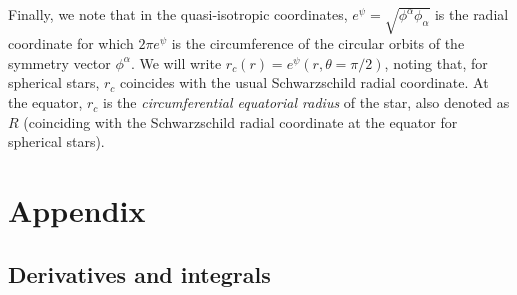 \documentclass[12pt]{article}
\begin{document}
{Finally, we note that in the quasi-isotropic coordinates, 
$e^\psi = \sqrt{\phi^\alpha\phi_\alpha}$ is the radial coordinate for which 
$2\pi e^\psi$ is the circumference of the circular orbits of the symmetry vector 
$\phi^\alpha$. We will write $r_c(r) = e^\psi(r,\theta=\pi/2)$, noting that, 
for spherical stars, $r_c$ coincides with the usual Schwarzschild radial coordinate. 
At the equator, $r_c$ is the {\it circumferential equatorial radius} of the 
star, also denoted as $R$ (coinciding with the Schwarzschild radial coordinate 
at the equator for spherical stars). 

\newpage

\section*{Appendix}

\subsection*{Derivatives and integrals}

}
\end{document}
